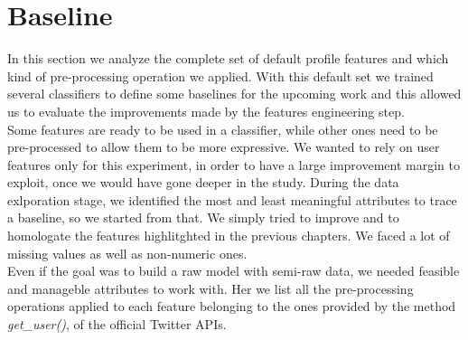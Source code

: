 \section{Baseline}
In this section we analyze the complete set of default profile features and which kind of pre-processing operation we applied. With this default set we trained several classifiers to define some baselines for the upcoming work and this allowed us to evaluate the improvements made by the features engineering step.\\
Some features are ready to be used in a classifier, while other ones need to be pre-processed to allow them to be more expressive.
We wanted to rely on user features only for this experiment, in order to have a large improvement margin to exploit, once we would have gone deeper in the study.
During the data exlporation stage, we identified the most and least meaningful attributes to trace a baseline, so we started from that. We simply tried to improve and to homologate the features highlitghted in the previous chapters.
We faced a lot of missing values as well as non-numeric ones.\\
Even if the goal was to build a raw model with semi-raw data, we needed feasible and manageble attributes to work with.
Her we list all the pre-processing operations applied to each feature belonging to the ones provided by the method \textit{get\_user()}, of the official Twitter APIs.

